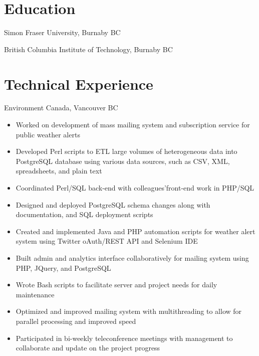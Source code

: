 \documentclass{ik_resume}
\begin{document}
\section{Education}


Simon Fraser University, Burnaby BC


British Columbia Institute of Technology, Burnaby BC


\section{Technical Experience}


Environment Canada, Vancouver BC

\begin{itemize}
  \itemsep0em
  \item Worked on development of mass mailing system and subscription service for public weather alerts
  \item Developed Perl scripts to ETL large volumes of heterogeneous data into PostgreSQL database using various data sources, such as CSV, XML, spreadsheets, and plain text
  \item Coordinated Perl/SQL back-end with colleagues'front-end work in PHP/SQL
  \item Designed and deployed PostgreSQL schema changes along with documentation, and SQL deployment scripts
  \item Created and implemented Java and PHP automation scripts for weather alert system using Twitter oAuth/REST API and Selenium IDE
  \item Built admin and analytics interface collaboratively for mailing system using PHP, JQuery, and PostgreSQL
  \item Wrote Bash scripts to facilitate server and project needs for daily maintenance
  \item Optimized and improved mailing system with multithreading to allow for parallel processing and improved speed
  \item Participated in bi-weekly teleconference meetings with management to collaborate and update on the project progress
\end{itemize}
\end{document}
